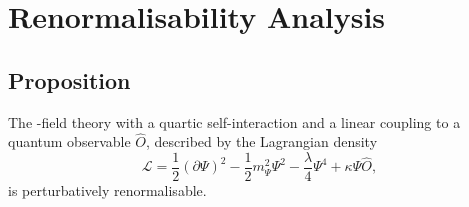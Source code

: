 \documentclass[11pt,a4paper]{article}
\newcommand{\PsiField}{\ensuremath{\Psi}}
\newcommand{\Lagr}{\ensuremath{\mathcal{L}}}
\begin{document}
\section{Renormalisability Analysis}
\label{sec:renormalisability-analysis}
\subsection*{Proposition}
The \PsiFieldField-field theory with a quartic self-interaction and a linear coupling to a quantum observable $\hat{O}$, described by the Lagrangian density
\begin{equation}
    \Lagr = \frac{1}{2}(\partial\PsiField)^{2}-\frac{1}{2}m_\PsiField^{2}\PsiField^{2}-\frac{\lambda}{4}\PsiField^{4} + \kappa\PsiField\hat{O},
\end{equation}
is perturbatively renormalisable.
\end{document}
